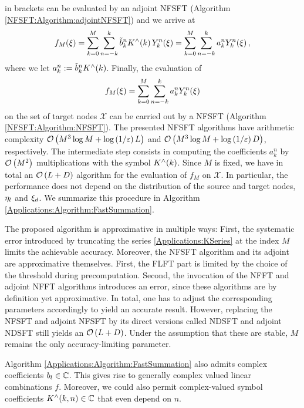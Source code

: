 in brackets can be evaluated by an adjoint NFSFT (Algorithm 
\ref{NFSFT:Algorithm:adjointNFSFT}) and we arrive at
\[
  f_{M}{\hspace{-0.4ex}}\left(\xi\right) = \sum_{k=0}^{M} \sum_{n=-k}^k \tilde{b}_{k}^n K^{\wedge}{\hspace{-0.4ex}}\left(k\right)
                     Y_{k}^n{\hspace{-0.4ex}}\left(\mathbf{\xi}\right) = \sum_{k=0}^{M} \sum_{n=-k}^k a_{k}^n
                     Y_{k}^n{\hspace{-0.4ex}}\left(\mathbf{\xi}\right),
\]
where we let $a_{k}^n := \tilde{b}_{k}^n K^{\wedge}{\hspace{-0.4ex}}\left(k\right)$. Finally, the evaluation of
\begin{equation}
\label{Applications:NDSFT}
  f_{M}{\hspace{-0.4ex}}\left(\mathbf{\xi}\right) = \sum_{k=0}^{M} \sum_{n=-k}^k a_{k}^n Y_{k}^n{\hspace{-0.4ex}}\left(\mathbf{\xi}\right)
\end{equation}
on the set of target nodes $\mathcal{X}$ can be carried out by a NFSFT 
(Algorithm \ref{NFSFT:Algorithm:NFSFT}). The presented NFSFT algorithms have arithmetic complexity 
$\mathcal{O}\left(M^3 \log M + \log{\hspace{-0.4ex}}\left(1/\varepsilon\right)L\right)$ and 
$\mathcal{O}\left(M^3 \log M + \log{\hspace{-0.4ex}}\left(1/\varepsilon\right)D\right)$, respectively. The intermediate 
step consists in computing the coefficients $a_{k}^n$ by $\mathcal{O}\left(M^2\right)$ multiplications
with the symbol $K^{\wedge}{\hspace{-0.4ex}}\left(k\right)$. Since $M$ is fixed, we have in total an
$\mathcal{O}\left(L + D\right)$ algorithm for the evaluation of $f_{M}$ on $\mathcal{X}$. In particular, the
performance does not depend on the distribution of the source and target nodes, 
$\mathbf{\eta}_{l}$ and $\mathbf{\xi}_{d}$. We summarize this procedure in Algorithm 
\ref{Applications:Algorithm:FastSummation}.

\begin{remark}
  The proposed algorithm is approximative in multiple ways: First, the systematic 
  error introduced by truncating the series \eqref{Applications:KSeries} at the 
  index $M$ limits the 
  achievable accuracy. Moreover, the NFSFT algorithm and its adjoint 
  are approximative themselves. First, the FLFT part is limited by the choice of the
  threshold during precomputation. Second, the invocation of the NFFT and adjoint 
  NFFT algorithms introduces an error, since these algorithms are by definition yet
  approximative. In total, one has to adjust the corresponding parameters accordingly 
  to yield an accurate result.
  However, replacing the NFSFT and adjoint NFSFT by its direct versions called NDSFT and 
  adjoint NDSFT still yields an $\mathcal{O}\left(L + D\right)$. Under the assumption that these are 
  stable, $M$ remains the only accuracy-limiting parameter.
\end{remark}

\begin{remark}
  Algorithm \ref{Applications:Algorithm:FastSummation} also admits complex 
  coefficients $b_{l} \in \mathbb{C}$. This gives rise to generally complex valued 
  linear combinations $f$. Moreover, we could also permit complex-valued 
  symbol coefficients $K^{\wedge}{\hspace{-0.4ex}}\left(k,n\right) \in \mathbb{C}$ that even depend on $n$. 
\end{remark}

